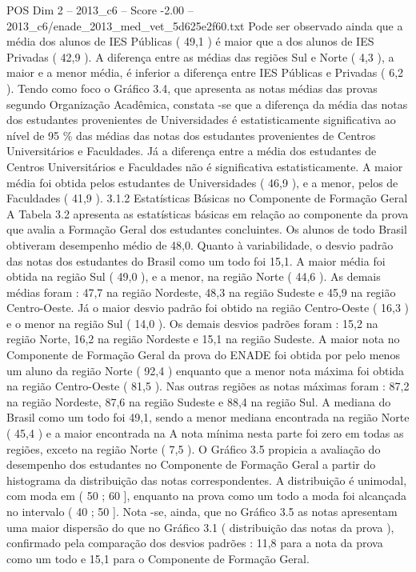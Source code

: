 \begin{textsample}{POS Dim 2 – 2013\_c6 – Score -2.00 – 2013\_c6/enade\_2013\_med\_vet\_5d625e2f60.txt}
Pode ser observado ainda que a média dos alunos de IES Públicas ( 49,1 ) é maior que a dos alunos de IES Privadas ( 42,9 ).
A diferença entre as médias das regiões Sul e Norte ( 4,3 ), a maior e a menor média, é inferior a diferença entre IES Públicas e Privadas ( 6,2 ).
Tendo como foco o Gráfico 3.4, que apresenta as notas médias das provas segundo Organização Acadêmica, constata -se que a diferença da média das notas dos estudantes provenientes de Universidades é estatisticamente significativa ao nível de 95 \% das médias das notas dos estudantes provenientes de Centros Universitários e Faculdades.
Já a diferença entre a média dos estudantes de Centros Universitários e Faculdades não é significativa estatisticamente.
A maior média foi obtida pelos estudantes de Universidades ( 46,9 ), e a menor, pelos de Faculdades ( 41,9 ). 3.1.2 Estatísticas Básicas no Componente de Formação Geral A Tabela 3.2 apresenta as estatísticas básicas em relação ao componente da prova que avalia a Formação Geral dos estudantes concluintes.
Os alunos de todo Brasil obtiveram desempenho médio de 48,0.
Quanto à variabilidade, o desvio padrão das notas dos estudantes do Brasil como um todo foi 15,1.
A maior média foi obtida na região Sul ( 49,0 ), e a menor, na região Norte ( 44,6 ).
As demais médias foram : 47,7 na região Nordeste, 48,3 na região Sudeste e 45,9 na região Centro-Oeste.
Já o maior desvio padrão foi obtido na região Centro-Oeste ( 16,3 ) e o menor na região Sul ( 14,0 ).
Os demais desvios padrões foram : 15,2 na região Norte, 16,2 na região Nordeste e 15,1 na região Sudeste.
A maior nota no Componente de Formação Geral da prova do ENADE foi obtida por pelo menos um aluno da região Norte ( 92,4 ) enquanto que a menor nota máxima foi obtida na região Centro-Oeste ( 81,5 ).
Nas outras regiões as notas máximas foram : 87,2 na região Nordeste, 87,6 na região Sudeste e 88,4 na região Sul.
A mediana do Brasil como um todo foi 49,1, sendo a menor mediana encontrada na região Norte ( 45,4 ) e a maior encontrada na A nota mínima nesta parte foi zero em todas as regiões, exceto na região Norte ( 7,5 ).
O Gráfico 3.5 propicia a avaliação do desempenho dos estudantes no Componente de Formação Geral a partir do histograma da distribuição das notas correspondentes.
A distribuição é unimodal, com moda em ( 50 ; 60 ], enquanto na prova como um todo a moda foi alcançada no intervalo ( 40 ; 50 ].
Nota -se, ainda, que no Gráfico 3.5 as notas apresentam uma maior dispersão do que no Gráfico 3.1 ( distribuição das notas da prova ), confirmado pela comparação dos desvios padrões : 11,8 para a nota da prova como um todo e 15,1 para o Componente de Formação Geral.

\end{textsample}
